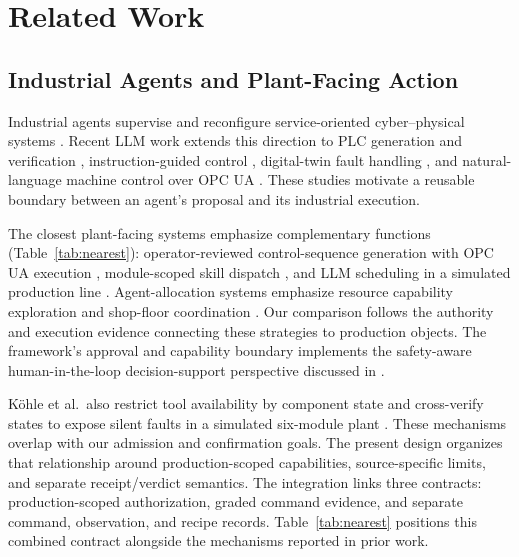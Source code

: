 \section{Related Work}
\label{sec:related}
\subsection{Industrial Agents and Plant-Facing Action}
Industrial agents supervise and reconfigure service-oriented cyber--physical systems
\cite{biskupovic2025supervision}. Recent LLM work extends this direction to
PLC generation and verification \cite{liu2026agents4plc}, instruction-guided
control \cite{wu2025instructmpc}, digital-twin fault handling
\cite{gill2025llmdt}, and natural-language machine control over OPC UA
\cite{hofmann2025nlc}. These studies motivate a reusable boundary between an
agent's proposal and its industrial execution.

The closest plant-facing systems emphasize complementary functions
(Table~\ref{tab:nearest}): operator-reviewed control-sequence generation with
OPC UA execution \cite{huang2026made}, module-scoped skill dispatch
\cite{koehle2026llmdriven}, and LLM scheduling in a simulated production
line \cite{waseem2026pretrained}. Agent-allocation systems emphasize resource
capability exploration and shop-floor coordination
\cite{lim2025llmenabled,zhao2026shopfloor}. Our comparison follows the
authority and execution evidence connecting these strategies to production
objects. The framework's approval and capability boundary implements the
safety-aware human-in-the-loop decision-support perspective discussed in
\cite{jiang2026agentic}.

K{\"o}hle et al.\ also restrict tool availability by component state and
cross-verify states to expose silent faults in a simulated six-module plant
\cite{koehle2026llmdriven}. These mechanisms overlap with our admission and
confirmation goals. The present design organizes that relationship around
production-scoped capabilities, source-specific limits, and separate
receipt/verdict semantics. The integration links three contracts:
production-scoped authorization, graded command evidence, and separate
command, observation, and recipe records. Table~\ref{tab:nearest} positions
this combined contract alongside the mechanisms reported in prior work.

